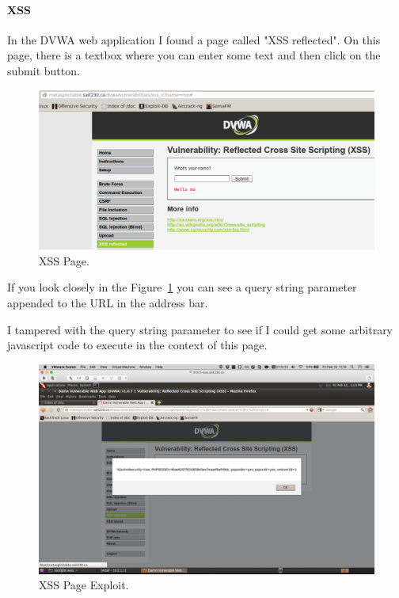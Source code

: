 \documentclass{article}
\begin{document}
\paragraph{XSS}
In the DVWA web application I found a page called "XSS reflected". 
On this page, there is a textbox where you can enter some text and then 
click on the submit button.

\begin{figure}[h!]
	\includegraphics[width=\linewidth]{images/dvwa-xss-page.png}
	\caption{XSS Page.}
	\label{fig:xss-page1}
\end{figure}

If you look closely in the Figure~\ref{fig:xss-page1} you can see a 
query string parameter appended to the URL in the address bar.

\newpage
I tampered with the query string parameter to see if I could get
some arbitrary javascript code to execute in the context of this
page.

\begin{figure}[h!]
	\includegraphics[width=\linewidth]{images/dvwa-xss-page-exploit.png}
	\caption{XSS Page Exploit.}
	\label{fig:xss-page2}
\end{figure}
\end{document}

